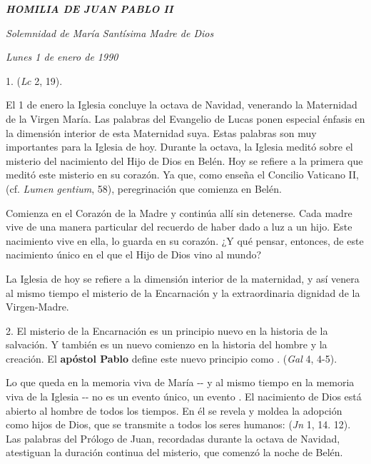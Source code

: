 \begin{body}
	\emph{\textbf{HOMILIA DE JUAN PABLO II}}
	
	\emph{Solemnidad de María Santísima Madre de Dios}
	
	\emph{Lunes 1 de enero de 1990}
	
	1.  (\emph{Lc} 2, 19).
	
	El 1 de enero la Iglesia concluye la octava de Navidad, venerando la Maternidad de la Virgen María. Las palabras del Evangelio de Lucas ponen especial énfasis en la dimensión interior de esta Maternidad suya. Estas palabras son muy importantes para la Iglesia de hoy. Durante la octava, la Iglesia meditó sobre el misterio del nacimiento del Hijo de Dios en Belén. Hoy se refiere a la primera que meditó este misterio en su corazón. Ya que, como enseña el Concilio Vaticano II,  (cf. \emph{Lumen gentium}, 58), peregrinación que comienza en Belén.
	
	Comienza en el Corazón de la Madre y continúa allí sin detenerse. Cada madre vive de una manera particular del recuerdo de haber dado a luz a un hijo. Este nacimiento vive en ella, lo guarda en su corazón. ¿Y qué pensar, entonces, de este nacimiento único en el que el Hijo de Dios vino al mundo?
	
	La Iglesia de hoy se refiere a la dimensión interior de la maternidad, y así venera al mismo tiempo el misterio de la Encarnación y la extraordinaria dignidad de la Virgen-Madre.
	
	2. El misterio de la Encarnación es un principio nuevo en la historia de la salvación. Y también es un nuevo comienzo en la historia del hombre y la creación. El \textbf{apóstol Pablo} define este nuevo principio como .  (\emph{Gal} 4, 4-5).
	
	Lo que queda en la memoria viva de María -\/- y al mismo tiempo en la memoria viva de la Iglesia -\/- no es un evento único, un evento . El nacimiento de Dios está abierto al hombre de todos los tiempos. En él se revela y moldea la adopción como hijos de Dios, que se transmite a todos los seres humanos:  (\emph{Jn} 1, 14. 12). Las palabras del Prólogo de Juan, recordadas durante la octava de Navidad, atestiguan la duración continua del misterio, que comenzó la noche de Belén.
	

\end{body}
